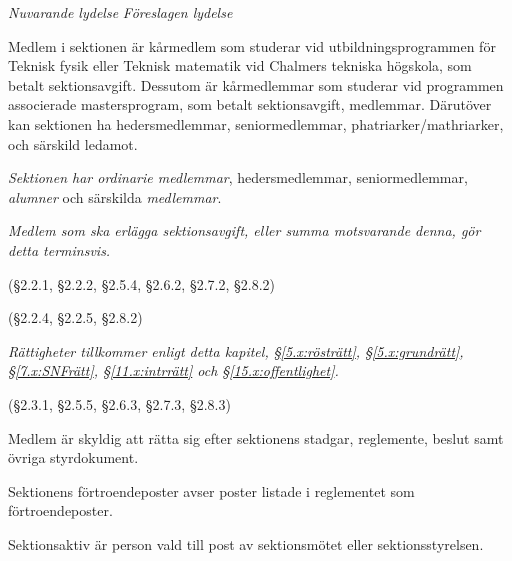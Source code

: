 \documentclass{article}
\newenvironment{lydelse}
    {\begin{paracol}{2}%
        \emph{Nuvarande lydelse}%
        \switchcolumn%
        \emph{Föreslagen lydelse}%
    \end{paracol}%
    \begin{enumerate}[label=\thesubsection.\arabic*]%
    \begin{paracol}{2}%
    }{\end{paracol}\end{enumerate}}
\begin{document}
\begin{lydelse}
    \item Medlem i sektionen är kårmedlem som studerar vid utbildningsprogrammen för Teknisk fysik eller Teknisk matematik vid Chalmers tekniska högskola, som betalt sektionsavgift. Dessutom är kårmedlemmar som studerar vid programmen associerade mastersprogram, som betalt sektionsavgift, medlemmar. Därutöver kan sektionen ha hedersmedlemmar, seniormedlemmar, phatri\-arker/\-mathri\-arker, och särskild ledamot.
    
  \switchcolumn
  \setcounter{enumi}{0}
    \item \emph{Sektionen har ordinarie medlemmar}, hedersmedlemmar, seniormedlemmar, \emph{alumner} och särskilda \emph{medlemmar}.
    
  \switchcolumn*
  \switchcolumn
    \item \emph{Medlem som ska erlägga sektionsavgift, eller summa motsvarande denna, gör detta terminsvis.}


  \switchcolumn*
    \item[] (\S 2.2.1, \S 2.2.2, \S 2.5.4, \S 2.6.2, \S 2.7.2, \S 2.8.2)
    \item[] (\S 2.2.4, \S 2.2.5, \S 2.8.2)
  \switchcolumn
    \item \emph{Rättigheter tillkommer enligt detta kapitel, \S\ref{5.x:rösträtt}, \S\ref{5.x:grundrätt}, \S\ref{7.x:SNFrätt}, \S\ref{11.x:intrrätt} och \S\ref{15.x:offentlighet}.} \label{2.x:allarätt} 
    
  \switchcolumn*
    (\S 2.3.1, \S 2.5.5, \S 2.6.3, \S 2.7.3, \S 2.8.3)

  \switchcolumn
    \item Medlem är skyldig att rätta sig efter sektionens stadgar, regle\-mente, beslut samt övriga styrdokument.
      \label{2.1:skyldig}
    
  \switchcolumn*
  \setcounter{subsection}{4}
  \setcounter{enumi}{0}
    \item Sektionens förtroendeposter avser poster listade i reglementet som förtroendeposter.
    
    \item Sektionsaktiv är person vald till post av sektionsmötet eller sektionsstyrelsen.
    

\end{lydelse}
\end{document}

